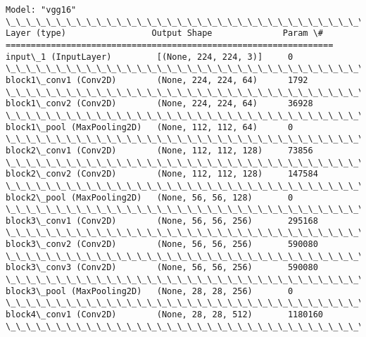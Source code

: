 \documentclass[11pt]{article}
\begin{document}
    \begin{Verbatim}[commandchars=\\\{\}]
Model: "vgg16"
\_\_\_\_\_\_\_\_\_\_\_\_\_\_\_\_\_\_\_\_\_\_\_\_\_\_\_\_\_\_\_\_\_\_\_\_\_\_\_\_\_\_\_\_\_\_\_\_\_\_\_\_\_\_\_\_\_\_\_\_\_\_\_\_\_
Layer (type)                 Output Shape              Param \#
=================================================================
input\_1 (InputLayer)         [(None, 224, 224, 3)]     0
\_\_\_\_\_\_\_\_\_\_\_\_\_\_\_\_\_\_\_\_\_\_\_\_\_\_\_\_\_\_\_\_\_\_\_\_\_\_\_\_\_\_\_\_\_\_\_\_\_\_\_\_\_\_\_\_\_\_\_\_\_\_\_\_\_
block1\_conv1 (Conv2D)        (None, 224, 224, 64)      1792
\_\_\_\_\_\_\_\_\_\_\_\_\_\_\_\_\_\_\_\_\_\_\_\_\_\_\_\_\_\_\_\_\_\_\_\_\_\_\_\_\_\_\_\_\_\_\_\_\_\_\_\_\_\_\_\_\_\_\_\_\_\_\_\_\_
block1\_conv2 (Conv2D)        (None, 224, 224, 64)      36928
\_\_\_\_\_\_\_\_\_\_\_\_\_\_\_\_\_\_\_\_\_\_\_\_\_\_\_\_\_\_\_\_\_\_\_\_\_\_\_\_\_\_\_\_\_\_\_\_\_\_\_\_\_\_\_\_\_\_\_\_\_\_\_\_\_
block1\_pool (MaxPooling2D)   (None, 112, 112, 64)      0
\_\_\_\_\_\_\_\_\_\_\_\_\_\_\_\_\_\_\_\_\_\_\_\_\_\_\_\_\_\_\_\_\_\_\_\_\_\_\_\_\_\_\_\_\_\_\_\_\_\_\_\_\_\_\_\_\_\_\_\_\_\_\_\_\_
block2\_conv1 (Conv2D)        (None, 112, 112, 128)     73856
\_\_\_\_\_\_\_\_\_\_\_\_\_\_\_\_\_\_\_\_\_\_\_\_\_\_\_\_\_\_\_\_\_\_\_\_\_\_\_\_\_\_\_\_\_\_\_\_\_\_\_\_\_\_\_\_\_\_\_\_\_\_\_\_\_
block2\_conv2 (Conv2D)        (None, 112, 112, 128)     147584
\_\_\_\_\_\_\_\_\_\_\_\_\_\_\_\_\_\_\_\_\_\_\_\_\_\_\_\_\_\_\_\_\_\_\_\_\_\_\_\_\_\_\_\_\_\_\_\_\_\_\_\_\_\_\_\_\_\_\_\_\_\_\_\_\_
block2\_pool (MaxPooling2D)   (None, 56, 56, 128)       0
\_\_\_\_\_\_\_\_\_\_\_\_\_\_\_\_\_\_\_\_\_\_\_\_\_\_\_\_\_\_\_\_\_\_\_\_\_\_\_\_\_\_\_\_\_\_\_\_\_\_\_\_\_\_\_\_\_\_\_\_\_\_\_\_\_
block3\_conv1 (Conv2D)        (None, 56, 56, 256)       295168
\_\_\_\_\_\_\_\_\_\_\_\_\_\_\_\_\_\_\_\_\_\_\_\_\_\_\_\_\_\_\_\_\_\_\_\_\_\_\_\_\_\_\_\_\_\_\_\_\_\_\_\_\_\_\_\_\_\_\_\_\_\_\_\_\_
block3\_conv2 (Conv2D)        (None, 56, 56, 256)       590080
\_\_\_\_\_\_\_\_\_\_\_\_\_\_\_\_\_\_\_\_\_\_\_\_\_\_\_\_\_\_\_\_\_\_\_\_\_\_\_\_\_\_\_\_\_\_\_\_\_\_\_\_\_\_\_\_\_\_\_\_\_\_\_\_\_
block3\_conv3 (Conv2D)        (None, 56, 56, 256)       590080
\_\_\_\_\_\_\_\_\_\_\_\_\_\_\_\_\_\_\_\_\_\_\_\_\_\_\_\_\_\_\_\_\_\_\_\_\_\_\_\_\_\_\_\_\_\_\_\_\_\_\_\_\_\_\_\_\_\_\_\_\_\_\_\_\_
block3\_pool (MaxPooling2D)   (None, 28, 28, 256)       0
\_\_\_\_\_\_\_\_\_\_\_\_\_\_\_\_\_\_\_\_\_\_\_\_\_\_\_\_\_\_\_\_\_\_\_\_\_\_\_\_\_\_\_\_\_\_\_\_\_\_\_\_\_\_\_\_\_\_\_\_\_\_\_\_\_
block4\_conv1 (Conv2D)        (None, 28, 28, 512)       1180160
\_\_\_\_\_\_\_\_\_\_\_\_\_\_\_\_\_\_\_\_\_\_\_\_\_\_\_\_\_\_\_\_\_\_\_\_\_\_\_\_\_\_\_\_\_\_\_\_\_\_\_\_\_\_\_\_\_\_\_\_\_\_\_\_\_

\end{Verbatim}
\end{document}
